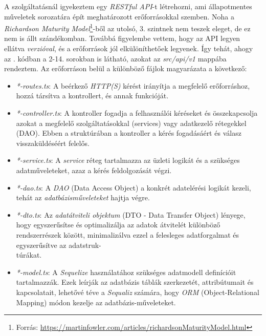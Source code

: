 \documentclass[
]{thesis-ekf}
\theoremstyle{definition}
\theoremstyle{remark}
\begin{document}
A szolgáltatásnál igyekeztem egy \emph{RESTful API}-t létrehozni, ami állapotmentes műveletek sorozatára épít meghatározott erőforrásokkal szemben. Noha a \emph{Richardson Maturity Model}\footnote{Forrás: \url{https://martinfowler.com/articles/richardsonMaturityModel.html}}-ből az utolsó, 3. szintnek nem teszek eleget, de ez nem is állt szándékomban. Továbbá figyelembe vettem, hogy az API legyen ellátva \emph{verzióval}, és a erőforrások jól elkülöníthetőek legyenek. Így tehát, ahogy az . kódban a 2-14. sorokban is látható, azokat az \emph{src/api/v1} mappába rendeztem. Az erőforráson belül a különböző fájlok magyarázata a következő:
\begin{itemize}
	\item \emph{*-routes.ts}: A beérkező \emph{HTTP(S)} kérést irányítja a megfelelő erőforráshoz, hozzá társítva a kontrollert, és annak funkcióját.
	\item \emph{*-controller.ts}: A kontroller fogadja a felhasználói kéréseket és összekapcsolja azokat a megfelelő szolgáltatásokkal (services) vagy adatkezelő rétegekkel (DAO). Ebben a struktúrában a kontroller a kérés fogadásáért és válasz visszaküldéséért felelős.
	\item \emph{*-service.ts}: A \emph{service} réteg tartalmazza az üzleti logikát és a szükséges adatműveleteket, azaz a kérés feldolgozását végzi.
	\item \emph{*-dao.ts}: A \emph{DAO} (Data Access Object) a konkrét adatelérési logikát kezeli, tehát az \emph{adatbázisműveleteket} hajtja végre.
	\item \emph{*-dto.ts}: Az \emph{adatátviteli objektum} (DTO - Data Transfer Object) lényege, hogy egyszerűsítse és optimalizálja az adatok átvitelét különböző rendszerrészek között, minimalizálva ezzel a felesleges adatforgalmat és egyszerűsítve az adatstruk-\\túrákat.\cite{wiki-dto-hun}
	\item \emph{*-model.ts}: A \emph{Sequelize} használatához szükséges adatmodell definícióit tartalmazzák. Ezek leírják az adatbázis táblák szerkezetét, attribútumait és kapcsolatait, lehetővé téve a \emph{Sequaliz} számára, hogy \emph{ORM} (Object-Relational Mapping) módon kezelje az adatbázis-műveleteket.
\end{itemize}
\end{document}
